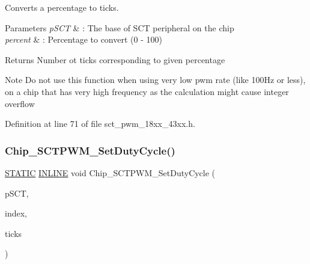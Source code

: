 Converts a percentage to ticks. 


\begin{DoxyParams}{Parameters}
{\em p\+S\+CT} & \+: The base of S\+CT peripheral on the chip \\
\hline
{\em percent} & \+: Percentage to convert (0 -\/ 100) \\
\hline
\end{DoxyParams}
\begin{DoxyReturn}{Returns}
Number ot ticks corresponding to given percentage 
\end{DoxyReturn}
\begin{DoxyNote}{Note}
Do not use this function when using very low pwm rate (like 100\+Hz or less), on a chip that has very high frequency as the calculation might cause integer overflow 
\end{DoxyNote}


Definition at line 71 of file sct\+\_\+pwm\+\_\+18xx\+\_\+43xx.\+h.

\mbox{\label{group___s_c_t___p_w_m__18_x_x__43_x_x_ga3e77a40e96ba3352a341054f6d1c506c}} 
\subsubsection{\texorpdfstring{Chip\+\_\+\+S\+C\+T\+P\+W\+M\+\_\+\+Set\+Duty\+Cycle()}{Chip\_SCTPWM\_SetDutyCycle()}}
{\footnotesize\ttfamily \hyperlink{group___l_p_c___types___public___macros_ga10b2d890d871e1489bb02b7e70d9bdfb}{S\+T\+A\+T\+IC} \hyperlink{spifi__18xx__43xx_8h_a2eb6f9e0395b47b8d5e3eeae4fe0c116}{I\+N\+L\+I\+NE} void Chip\+\_\+\+S\+C\+T\+P\+W\+M\+\_\+\+Set\+Duty\+Cycle (\begin{DoxyParamCaption}\item[{\hyperlink{struct_l_p_c___s_c_t___t}{L\+P\+C\+\_\+\+S\+C\+T\+\_\+T} $\ast$}]{p\+S\+CT,  }\item[{uint8\+\_\+t}]{index,  }\item[{uint32\+\_\+t}]{ticks }\end{DoxyParamCaption})}



